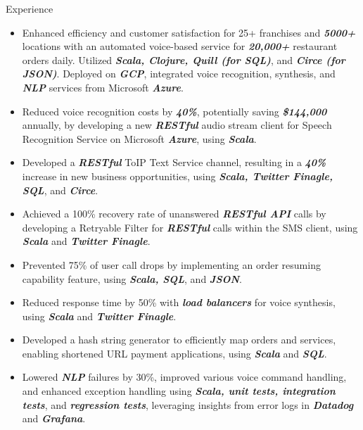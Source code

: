 \documentclass{resume} %
\begin{document}
\begin{workSection}{Experience}
      \experienceItem[
      company=Novo Labs Inc,
      location=Dallas{,} TX,
      position=Software Engineer,
      duration=Feb. 2021 – June 2023
      ]
      \vspace{-0.65em}
      \begin{itemize}
            \itemsep -6pt {}
            \item Enhanced efficiency and customer satisfaction for 25+ franchises and \textit{\textbf{5000+}} locations with an automated voice-based service for \textit{\textbf{20,000+}} restaurant orders daily. Utilized \textit{\textbf{Scala, Clojure, Quill (for SQL)}}, and \textit{\textbf{Circe (for JSON)}}. Deployed on \textit{\textbf{GCP}}, integrated voice recognition, synthesis, and \textit{\textbf{NLP}} services from Microsoft \textit{\textbf{Azure}}.
            \item Reduced voice recognition costs by \textit{\textbf{40\%}}, potentially saving \textit{\textbf{\$144,000}} annually, by developing a new \textit{\textbf{RESTful}} audio stream client for Speech Recognition Service on Microsoft \textit{\textbf{Azure}}, using \textit{\textbf{Scala}}.
            \item Developed a \textit{\textbf{RESTful}} ToIP Text Service channel, resulting in a \textit{\textbf{40\%}} increase in new business opportunities, using \textit{\textbf{Scala, Twitter Finagle, SQL}}, and \textit{\textbf{Circe}}.
            \item Achieved a 100\% recovery rate of unanswered \textit{\textbf{RESTful API}} calls by developing a Retryable Filter for \textit{\textbf{RESTful}} calls within the SMS client, using \textit{\textbf{Scala}} and \textit{\textbf{Twitter Finagle}}.
            \item Prevented 75\% of user call drops by implementing an order resuming capability feature, using \textit{\textbf{Scala, SQL}}, and \textit{\textbf{JSON}}.
            \item Reduced response time by 50\% with \textit{\textbf{load balancers}} for voice synthesis, using \textit{\textbf{Scala}} and \textit{\textbf{Twitter Finagle}}.
            \item Developed a hash string generator to efficiently map orders and services, enabling shortened URL payment applications, using \textit{\textbf{Scala}} and \textit{\textbf{SQL}}.
            \item Lowered \textit{\textbf{NLP}} failures by 30\%, improved various voice command handling, and enhanced exception handling using \textit{\textbf{Scala, unit tests, integration tests}}, and \textit{\textbf{regression tests}}, leveraging insights from error logs in \textit{\textbf{Datadog}} and \textit{\textbf{Grafana}}.

\end{itemize}
\end{workSection}
\end{document}
